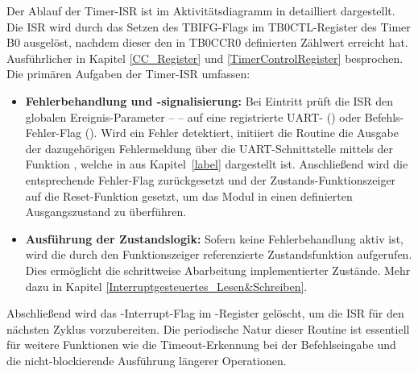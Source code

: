 Der Ablauf der Timer-ISR ist im Aktivit\"atsdiagramm in  detailliert dargestellt. Die ISR wird durch das Setzen des TBIFG-Flags im TB0CTL-Register des Timer B0 ausgel\"ost, nachdem dieser den in TB0CCR0 definierten Z\"ahlwert erreicht hat. Ausf\"uhrlicher in Kapitel \ref{CC_Register} und \ref{TimerControlRegister} besprochen. Die prim\"aren Aufgaben der Timer-ISR umfassen:

\begin{itemize}
	\item \textbf{Fehlerbehandlung und -signalisierung:} Bei Eintritt pr\"uft die ISR den globalen Ereignis-Parameter --  -- auf eine registrierte UART- () oder Befehls-Fehler-Flag (). Wird ein Fehler detektiert, initiiert die Routine die Ausgabe der dazugeh\"origen Fehlermeldung \"uber die UART-Schnittstelle mittels der Funktion , welche in  aus Kapitel~\ref{label} dargestellt ist. Anschlie{\ss}end wird die entsprechende Fehler-Flag zur\"uckgesetzt und der Zustands-Funktionszeiger  auf die Reset-Funktion  gesetzt, um das Modul in einen definierten Ausgangszustand zu \"uberf\"uhren.

	\item \textbf{Ausf\"uhrung der Zustandslogik:} Sofern keine Fehlerbehandlung aktiv ist, wird die durch den Funktionszeiger  referenzierte Zustandsfunktion aufgerufen. Dies erm\"oglicht die schrittweise Abarbeitung implementierter Zust\"ande. Mehr dazu in Kapitel \ref{Interruptgesteuertes_Lesen&Schreiben}.
\end{itemize}

Abschlie{\ss}end wird das -Interrupt-Flag im -Register gel\"oscht, um die ISR f\"ur den n\"achsten Zyklus vorzubereiten. Die periodische Natur dieser Routine ist essentiell f\"ur weitere Funktionen wie die Timeout-Erkennung bei der Befehlseingabe und die nicht-blockierende Ausf\"uhrung l\"angerer Operationen.

